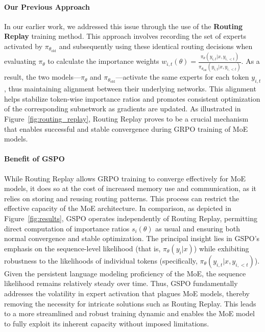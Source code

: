 \paragraph{Our Previous Approach} In our earlier work, we addressed this issue through the use of the \textbf{Routing Replay} training method. This approach involves recording the set of experts activated by $\pi_{\theta_\text{old}}$ and subsequently using these identical routing decisions when evaluating $\pi_{\theta}$ to calculate the importance weights $w_{i,t}(\theta) = \frac{ \pi_{\theta} (y_{i,t} | x, y_{i,<t}) }{ \pi_{\theta_\text{old}} (y_{i,t} | x,y_{i,<t})}$. As a result, the two models—$\pi_{\theta}$ and $\pi_{\theta_\text{old}}$—activate the same experts for each token $y_{i,t}$, thus maintaining alignment between their underlying networks. This alignment helps stabilize token-wise importance ratios and promotes consistent optimization of the corresponding subnetwork as gradients are updated. As illustrated in Figure~\ref{fig:routing_replay}, Routing Replay proves to be a crucial mechanism that enables successful and stable convergence during GRPO training of MoE models.

\paragraph{Benefit of GSPO} While Routing Replay allows GRPO training to converge effectively for MoE models, it does so at the cost of increased memory use and communication, as it relies on storing and reusing routing patterns. This process can restrict the effective capacity of the MoE architecture. In comparison, as depicted in Figure~\ref{fig:results}, GSPO operates independently of Routing Replay, permitting direct computation of importance ratios $s_i(\theta)$ as usual and ensuring both normal convergence and stable optimization. The principal insight lies in GSPO's emphasis on the sequence-level likelihood (that is, $\pi_{\theta} (y_i | x)$) while exhibiting robustness to the likelihoods of individual tokens (specifically, $\pi_{\theta} (y_{i,t} | x, y_{i,<t})$). Given the persistent language modeling proficiency of the MoE, the sequence likelihood remains relatively steady over time. Thus, GSPO fundamentally addresses the volatility in expert activation that plagues MoE models, thereby removing the necessity for intricate solutions such as Routing Replay. This leads to a more streamlined and robust training dynamic and enables the MoE model to fully exploit its inherent capacity without imposed limitations.

